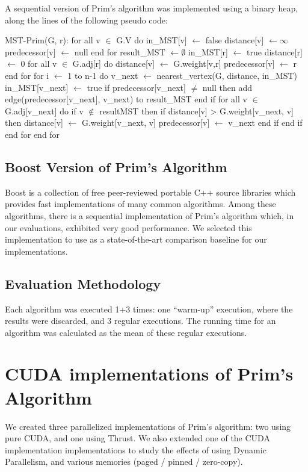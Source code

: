 \documentclass[sigconf,nonacm]{acmart}
\begin{document}
A  sequential version of Prim’s algorithm was implemented using a binary heap,
along the lines of the following pseudo code:
\begin{algorithm}[caption={Sequential Prim}, label={prim:cpu}]
MST-Prim(G, r):
for all v $\in$ G.V do
  in_MST[v] $\gets$ false
  distance[v] $\gets \infty$
  predecessor[v] $\gets$ null
end for
result_MST $\gets \emptyset$
in_MST[r] $\gets$ true
distance[r] $\gets$ 0
for all v $\in$ G.adj[r] do
  distance[v] $\gets$ G.weight[v,r]
  predecessor[v] $\gets$ r
end for
for i $\gets$ 1 to n-1 do
  v_next $\gets$ nearest_vertex(G, distance, in_MST)
  in_MST[v_next] $\gets$ true
  if predecessor[v_next] $\ne$ null then
    add edge(predecessor[v_next], v_next) to result_MST
  end if
  for all v $\in$ G.adj[v_next] do
    if v $\notin$ resultMST then
      if distance[v] > G.weight[v_next, v] then
        distance[v] $\gets$ G.weight[v_next, v]
        predecessor[v] $\gets$ v_next
      end if
    end if
  end for
end for
\end{algorithm}

\subsection{Boost Version of Prim’s Algorithm}

Boost is a collection of free peer-reviewed portable C++ source libraries which provides fast implementations of many common algorithms. Among these algorithms, there is a sequential implementation of Prim’s algorithm which, in our evaluations, exhibited very good performance. We selected this implementation to use as a state-of-the-art comparison baseline for our implementations.


\subsection{Evaluation Methodology}

Each algorithm was executed 1+3 times: one “warm-up” execution, where the results were discarded, and 3 regular executions. The running time for an algorithm was calculated as the mean of these regular executions.

\section{CUDA implementations of Prim’s Algorithm}

We created three parallelized implementations of Prim’s algorithm: two using pure CUDA, and one using Thrust. We also extended one of the CUDA implementation implementations to study the effects of using Dynamic Parallelism, and various memories (paged / pinned / zero-copy).
\end{document}
